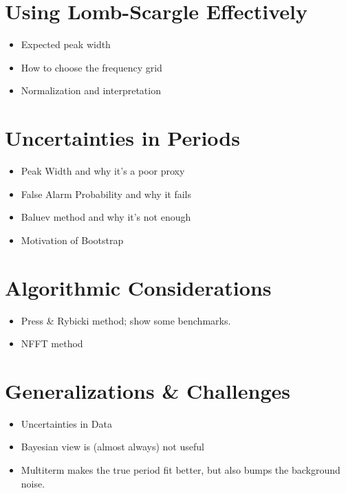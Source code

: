 \documentclass[preprint]{aastex}
\begin{document}
\section{Using Lomb-Scargle Effectively}

\begin{itemize}
  \item Expected peak width
  \item How to choose the frequency grid
  \item Normalization and interpretation
\end{itemize}


\section{Uncertainties in Periods}

\begin{itemize}
  \item Peak Width and why it's a poor proxy
  \item False Alarm Probability and why it fails
  \item Baluev method and why it's not enough
  \item Motivation of Bootstrap
\end{itemize}



\section{Algorithmic Considerations}

\begin{itemize}
\item Press \& Rybicki method; show some benchmarks.
\item NFFT method
\end{itemize}



\section{Generalizations \& Challenges}

\begin{itemize}
\item Uncertainties in Data
\item Bayesian view is (almost always) not useful
\item Multiterm makes the true period fit better, but also bumps the background noise.
\end{itemize}
\end{document}
